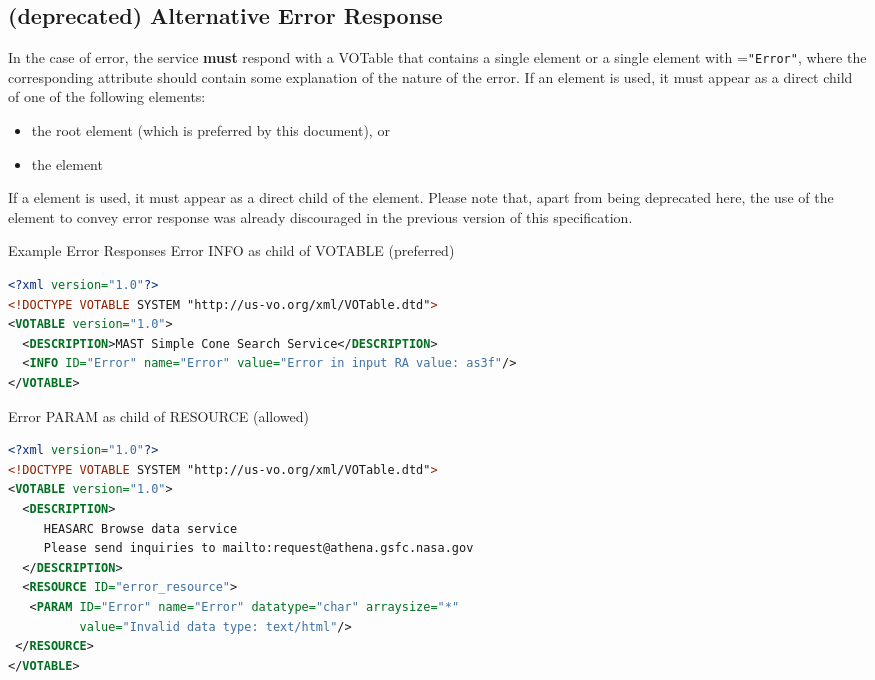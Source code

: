 \documentclass[11pt,a4paper]{ivoa}
\begin{document}
\subsection{(\textbf{deprecated}) Alternative Error Response}
\label{subsec:err103}
In the case of error, the service \textbf{must} respond with a VOTable that contains a single  element or a single  element with =\texttt{"Error"}, where the corresponding  attribute should contain some explanation of the nature of the error. If an  element is used, it must appear as a direct child of one of the following elements:
\begin{itemize}
	\item the root  element (which is preferred by this document), or
	\item the  element
\end{itemize}

If a  element is used, it must appear as a direct child of  the  element. Please note that, apart from being deprecated here, the use of the  element to convey error response was already discouraged in the previous version of this specification.

\begin{bigdescription}
	\item[Example Error Responses] Error INFO as child of VOTABLE (preferred)\\
	\begin{lstlisting}[language=XML,basicstyle=\footnotesize]
<?xml version="1.0"?>
<!DOCTYPE VOTABLE SYSTEM "http://us-vo.org/xml/VOTable.dtd">
<VOTABLE version="1.0">
  <DESCRIPTION>MAST Simple Cone Search Service</DESCRIPTION>
  <INFO ID="Error" name="Error" value="Error in input RA value: as3f"/>
</VOTABLE>
	\end{lstlisting}
	Error PARAM as child of RESOURCE (allowed)
	\begin{lstlisting}[language=XML,basicstyle=\footnotesize]
<?xml version="1.0"?>
<!DOCTYPE VOTABLE SYSTEM "http://us-vo.org/xml/VOTable.dtd">
<VOTABLE version="1.0">
  <DESCRIPTION>
     HEASARC Browse data service
     Please send inquiries to mailto:request@athena.gsfc.nasa.gov
  </DESCRIPTION>
  <RESOURCE ID="error_resource">
   <PARAM ID="Error" name="Error" datatype="char" arraysize="*"
          value="Invalid data type: text/html"/>
 </RESOURCE>
</VOTABLE>
	\end{lstlisting}
\end{bigdescription}
\end{document}
